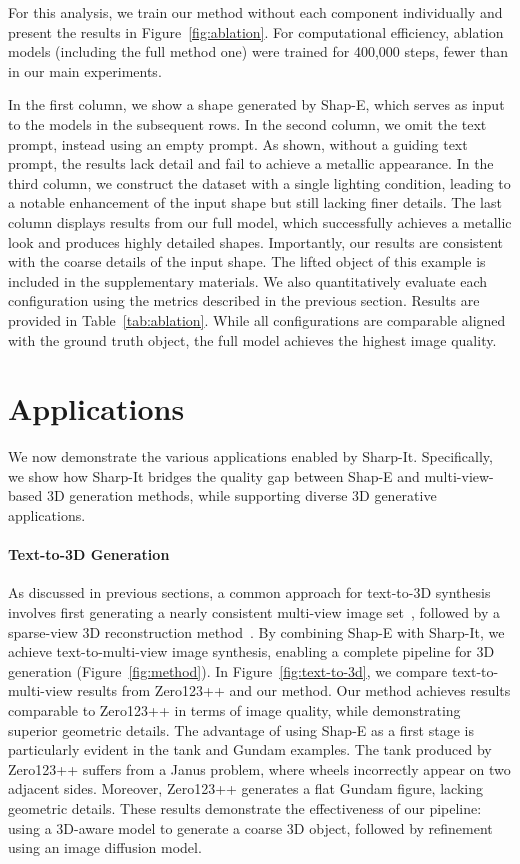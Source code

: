 For this analysis, we train our method without each component individually and present the results in Figure~\ref{fig:ablation}.
For computational efficiency, ablation models (including the full method one) were trained for 400,000 steps, fewer than in our main experiments.

In the first column, we show a shape generated by Shap-E, which serves as input to the models in the subsequent rows. In the second column, we omit the text prompt, instead using an empty prompt. As shown, without a guiding text prompt, the results lack detail and fail to achieve a metallic appearance. In the third column, we construct the dataset with a single lighting condition, leading to a notable enhancement of the input shape but still lacking finer details. The last column displays results from our full model, which successfully achieves a metallic look and produces highly detailed shapes. Importantly, our results are consistent with the coarse details of the input shape. The lifted object of this example is included in the supplementary materials.
We also quantitatively evaluate each configuration using the metrics described in the previous section. Results are provided in Table~\ref{tab:ablation}. While all configurations are comparable aligned with the ground truth object, the full model achieves the highest image quality.




\section{Applications}
We now demonstrate the various applications enabled by Sharp-It. Specifically, we show how Sharp-It bridges the quality gap between Shap-E and multi-view-based 3D generation methods, while supporting diverse 3D generative applications.


\vspace{-16pt}
\paragraph{Text-to-3D Generation}
As discussed in previous sections, a common approach for text-to-3D synthesis involves first generating a nearly consistent multi-view image set~\cite{shi2024mvdream, wang2023imagedream, shi2023zero123singleimageconsistent}, followed by a sparse-view 3D reconstruction method~\cite{xu2024instantmesh}. By combining Shap-E with Sharp-It, we achieve text-to-multi-view image synthesis, enabling a complete pipeline for 3D generation (Figure~\ref{fig:method}).
In Figure~\ref{fig:text-to-3d}, we compare text-to-multi-view results from Zero123++ and our method. Our method achieves results comparable to Zero123++ in terms of image quality, while demonstrating superior geometric details. The advantage of using Shap-E as a first stage is particularly evident in the tank and Gundam examples. The tank produced by Zero123++ suffers from a Janus problem, where wheels incorrectly appear on two adjacent sides. Moreover, Zero123++ generates a flat Gundam figure, lacking geometric details. These results demonstrate the effectiveness of our pipeline: using a 3D-aware model to generate a coarse 3D object, followed by refinement using an image diffusion model.


